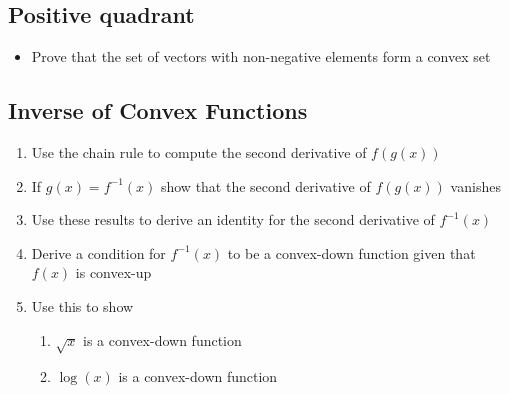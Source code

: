 \documentclass[11pt]{article}
\begin{document}
\subsection{Positive quadrant}
\label{sec:orgcb16fdf}
\begin{itemize}
\item Prove that the set of vectors with non-negative elements form a
convex set
\end{itemize}

\subsection{Inverse of Convex Functions}
\label{sec:org3e18f11}
\begin{enumerate}
\item Use the chain rule to compute the second derivative of \(f(g(x))\)
\item If \(g(x) = f^{-1}(x)\) show that the second derivative of
\(f(g(x))\) vanishes
\item Use these results to derive an identity for the second derivative
of \(f^{-1}(x)\)
\item Derive a condition for \(f^{-1}(x)\) to be a
convex-down function given that \(f(x)\) is convex-up
\item Use this to show
\begin{enumerate}
\item \(\sqrt{x}\) is a convex-down function
\item \(\log(x)\) is a convex-down function
\end{enumerate}
\end{enumerate}
\end{document}

